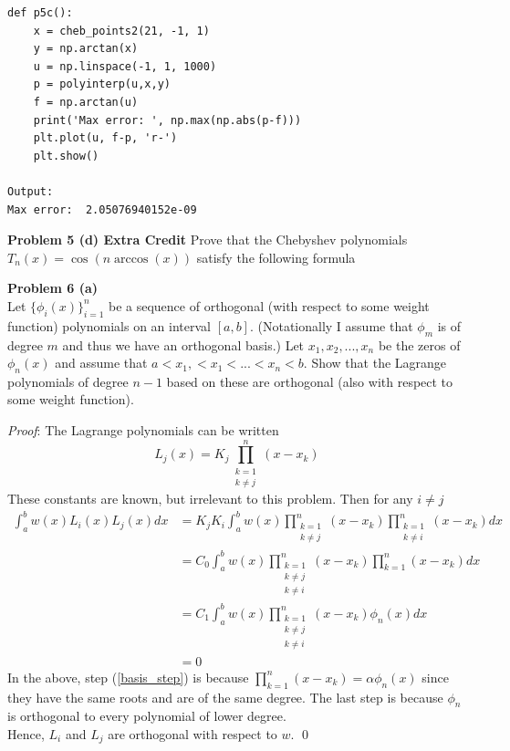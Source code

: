 \documentclass[12pt]{article}
\newcommand{\problem}[1]{\hspace{-4 ex} \large \textbf{Problem #1} }
\renewenvironment{proof}{\hspace{-4 ex} \emph{Proof}:}{\qed}
\begin{document}
	\begin{lstlisting}
def p5c():
	x = cheb_points2(21, -1, 1)
	y = np.arctan(x)
	u = np.linspace(-1, 1, 1000)
	p = polyinterp(u,x,y)
	f = np.arctan(u)
	print('Max error: ', np.max(np.abs(p-f)))
	plt.plot(u, f-p, 'r-')
	plt.show()	
	
Output: 
Max error:  2.05076940152e-09
	\end{lstlisting}

\bigbreak
\problem{5 (d) Extra Credit} Prove that the Chebyshev polynomials $T_n(x) = \cos(n\arccos(x))$ satisfy the following formula
$$

$$


\bigbreak
\problem{6 (a)} \\

	Let $\{\phi_i(x)\}_{i=1}^n$ be a sequence of orthogonal (with respect to some weight function) polynomials on an interval $[a,b]$. (Notationally I assume that $\phi_m$ is of degree $m$ and thus we have an orthogonal basis.) Let $x_1, x_2, ..., x_n$ be the zeros of $\phi_n(x)$ and assume that $a < x_1, < x_1 < ... < x_n < b$. Show that the Lagrange polynomials of degree $n-1$ based on these are orthogonal (also with respect to some weight function).
	
	\begin{proof}
		The Lagrange polynomials can be written
		$$
		L_j(x) = K_j \prod_{\substack{k=1 \\ k \neq j}}^n(x-x_k)
		$$
		These constants are known, but irrelevant to this problem. Then for any $i \neq j$
		\begin{align}
			\int_a^b w(x)L_i(x)L_j(x) dx & = K_jK_i \int_a^b w(x) \prod_{\substack{k=1 \\ k \neq j}}^n(x-x_k) \prod_{\substack{k=1 \\ k \neq i }}^n(x-x_k)  dx \nonumber \\
			& = C_0 \int_a^b w(x) \prod_{\substack{k=1 \\ k \neq j \\ k \neq i}}^n(x-x_k)  \prod_{k=1}^n(x-x_k) dx  \nonumber \\
			& = C_1 \int_a^b w(x) \prod_{\substack{k=1 \\ k \neq j \\ k \neq i}}^n(x-x_k)  \phi_n(x) dx \label{basis_step}\\
			& = 0
		\end{align}
		In the above, step (\ref{basis_step}) is because $\prod\limits_{k=1}^n (x-x_k) = \alpha \phi_n(x)$ since they have the same roots and are of the same degree. The last step is because $\phi_n$ is orthogonal to every polynomial of lower degree.\\
		Hence, $L_i$ and $L_j$ are orthogonal with respect to $w$. 
	\end{proof}
	
\end{document}
